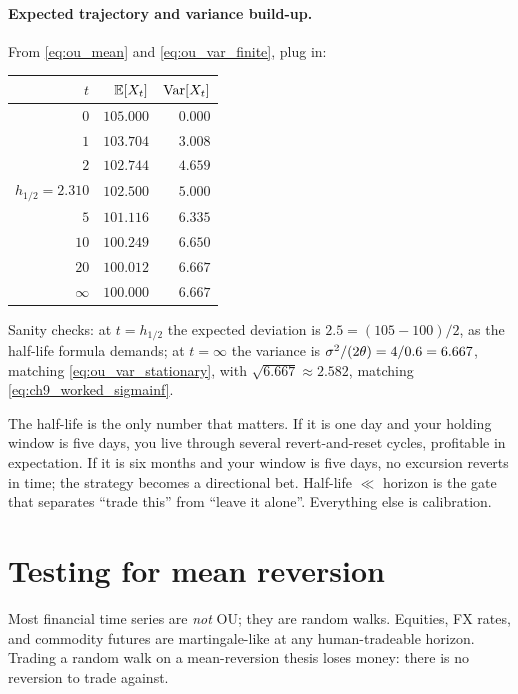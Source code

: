 \paragraph{Expected trajectory and variance build-up.} From
\eqref{eq:ou_mean} and \eqref{eq:ou_var_finite}, plug in:
\begin{center}
\begin{tabular}{rrr}
\toprule
$t$ & $\mathbb{E}[X_t]$ & $\operatorname{Var}[X_t]$ \\
\midrule
$0$        & $105.000$ & $0.000$ \\
$1$        & $103.704$ & $3.008$ \\
$2$        & $102.744$ & $4.659$ \\
$h_{1/2}=2.310$ & $102.500$ & $5.000$ \\
$5$        & $101.116$ & $6.335$ \\
$10$       & $100.249$ & $6.650$ \\
$20$       & $100.012$ & $6.667$ \\
$\infty$   & $100.000$ & $6.667$ \\
\bottomrule
\end{tabular}
\end{center}
Sanity checks: at $t = h_{1/2}$ the expected deviation is
$2.5 = (105-100)/2$, as the half-life formula demands; at
$t = \infty$ the variance is $\sigma^2/(2\theta) = 4/0.6 = 6.667$,
matching \eqref{eq:ou_var_stationary}, with
$\sqrt{6.667} \approx 2.582$, matching
\eqref{eq:ch9_worked_sigmainf}.

\begin{intuitionbox}
The half-life is the only number that matters. If it is one day
and your holding window is five days, you live through several
revert-and-reset cycles, profitable in expectation. If it is
six months and your window is five days, no excursion reverts in
time; the strategy becomes a directional bet. Half-life $\ll$
horizon is the gate that separates ``trade this'' from ``leave
it alone''. Everything else is calibration.
\end{intuitionbox}

\section{Testing for mean reversion}
\label{sec:ch9_tests}

Most financial time series are \emph{not} OU; they are random
walks. Equities, FX rates, and commodity futures are
martingale-like at any human-tradeable horizon. Trading a random
walk on a mean-reversion thesis loses money: there is no
reversion to trade against.

